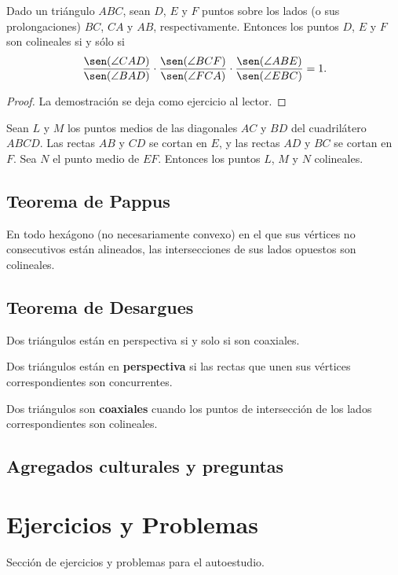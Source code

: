 \begin{section-theorem.tcb}
    Dado un triángulo $ABC$, sean $D$, $E$ y $F$ puntos sobre los lados (o sus prolongaciones) $BC$, $CA$ y $AB$, respectivamente.
    Entonces los puntos $D$, $E$ y $F$ son colineales si y sólo si
    \[
        \frac{\sen(\angle CAD)}{\sen(\angle BAD)} \cdot \frac{\sen(\angle BCF)}{\sen(\angle FCA)} \cdot \frac{\sen(\angle ABE)}{\sen(\angle EBC)} = 1.
    \]
\end{section-theorem.tcb}
\begin{proof}
    La demostración se deja como ejercicio al lector.
\end{proof}


\begin{section-theorem.tcb}
    Sean $L$ y $M$ los puntos medios de las diagonales $AC$ y $BD$ del cuadrilátero $ABCD$.
    Las rectas $AB$ y $CD$ se cortan en $E$, y las rectas $AD$ y $BC$ se cortan en $F$.
    Sea $N$ el punto medio de $EF$.
    Entonces los puntos $L$, $M$ y $N$ colineales.
\end{section-theorem.tcb}



\subsection{Teorema de Pappus}

\begin{section-theorem.tcb}
    En todo hexágono (no necesariamente convexo) en el que sus vértices no consecutivos están alineados, las intersecciones de sus lados opuestos son colineales.
\end{section-theorem.tcb}




\subsection{Teorema de Desargues}
\begin{section-theorem.tcb}
    Dos triángulos están en perspectiva si y solo si son coaxiales.
\end{section-theorem.tcb}

\begin{remark.tcb}
    Dos triángulos están en \textbf{perspectiva} si las rectas que unen sus vértices correspondientes son concurrentes.
\end{remark.tcb}

\begin{remark.tcb}
    Dos triángulos son \textbf{coaxiales} cuando los puntos de intersección de los lados correspondientes son colineales.
\end{remark.tcb}

\subsection{Agregados culturales y preguntas}






\section{Ejercicios y Problemas}
Sección de ejercicios y problemas para el autoestudio.
